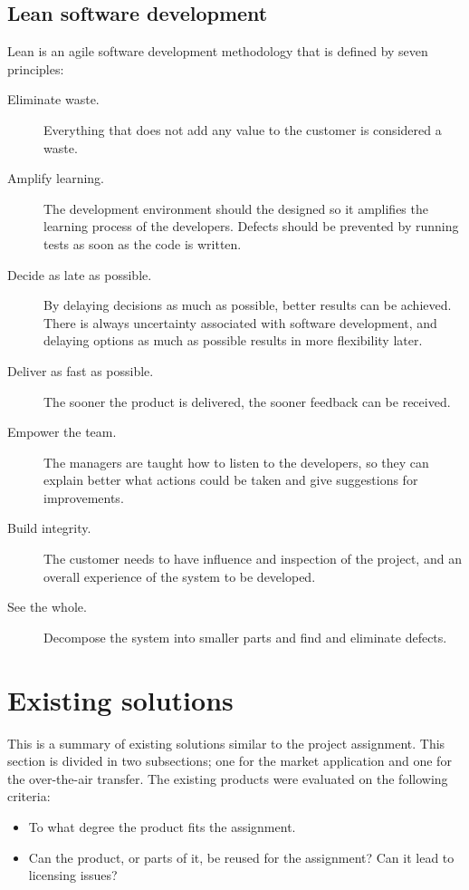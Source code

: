 \subsection{Lean software development}
\label{leandev}
Lean is an agile software development methodology that is defined by seven principles\cite{poppendieck}:
\begin{description}
	\item[Eliminate waste.]{Everything that does not add any value to the customer is considered a waste.}
	\item[Amplify learning.]{The development environment should the designed so it amplifies the learning process of the developers. Defects should be prevented by running tests as soon as the code is written.}
	\item[Decide as late as possible.]{By delaying decisions as much as possible, better results can be achieved. There is always uncertainty associated with software development, and delaying options as much as possible results in more flexibility later.}
	\item[Deliver as fast as possible.]{The sooner the product is delivered, the sooner feedback can be received.}
	\item[Empower the team.]{The managers are taught how to listen to the developers, so they can explain better what actions could be taken and give suggestions for improvements.}
	\item[Build integrity.]{The customer needs to have influence and inspection of the project, and an overall experience of the system to be developed.}
	\item[See the whole.]{Decompose the system into smaller parts and find and eliminate defects.}
\end{description}

\section{Existing solutions}
This is a summary of existing solutions similar to the project assignment. This section is divided in two subsections; one for the market application and one for the over-the-air transfer. The existing products were evaluated on the following criteria:
\begin{itemize}
	\item{To what degree the product fits the assignment.}
	\item{Can the product, or parts of it, be reused for the assignment? Can it lead to licensing issues?}
\end{itemize}

